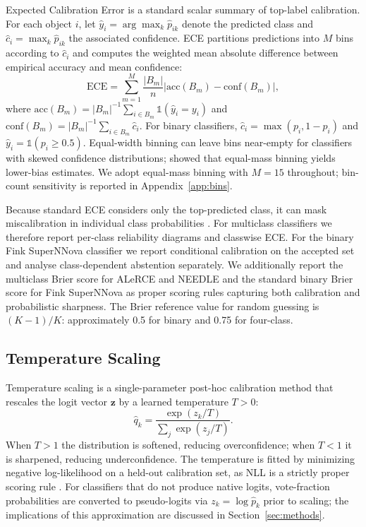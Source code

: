 \documentclass[a4paper,fleqn,usenatbib]{mnras}
\begin{document}
Expected Calibration Error \citep[ECE;][]{naeini2015} is a
standard scalar summary of top-label calibration. For each object
$i$, let $\hat{y}_i = \arg\max_k \hat{p}_{ik}$ denote the predicted
class and $\hat{c}_i = \max_k \hat{p}_{ik}$ the associated
confidence. ECE partitions predictions into $M$ bins according to
$\hat{c}_i$ and computes the weighted mean absolute difference
between empirical accuracy and mean confidence:
\begin{equation}
    \text{ECE} = \sum_{m=1}^{M} \frac{|B_m|}{n}
    \left| \text{acc}(B_m) - \text{conf}(B_m) \right|,
    \label{eq:ece}
\end{equation}
where $\text{acc}(B_m) =
|B_m|^{-1}\sum_{i\in B_m}\mathbb{1}(\hat{y}_i=y_i)$ and
$\text{conf}(B_m)=|B_m|^{-1}\sum_{i\in B_m}\hat{c}_i$.
For binary classifiers, $\hat{c}_i=\max(p_i,1-p_i)$ and
$\hat{y}_i=\mathbb{1}(p_i\geq 0.5)$. Equal-width binning can leave
bins near-empty for classifiers with skewed confidence distributions;
\citet{roelofs2022} showed that equal-mass binning yields lower-bias
estimates. We adopt equal-mass binning with $M=15$ throughout;
bin-count sensitivity is reported in Appendix~\ref{app:bins}.

Because standard ECE considers only the top-predicted class, it
can mask miscalibration in individual class probabilities
\citep{nixon2019}. For multiclass classifiers we therefore report
per-class reliability diagrams and classwise ECE. For the binary
Fink SuperNNova classifier we report conditional calibration on
the accepted set and analyse class-dependent abstention separately.
We additionally report the multiclass Brier score \citep{brier1950}
for ALeRCE and NEEDLE and the standard binary Brier score for
Fink SuperNNova as proper scoring rules capturing both calibration
and probabilistic sharpness. The Brier reference value for random
guessing is $(K-1)/K$: approximately 0.5 for binary and 0.75
for four-class.

\subsection{Temperature Scaling}\label{sec:tempscaling}

Temperature scaling \citep{guo2017} is a single-parameter post-hoc
calibration method that rescales the logit vector $\mathbf{z}$ by
a learned temperature $T > 0$:
\begin{equation}
    \hat{q}_k = \frac{\exp(z_k/T)}{\sum_j \exp(z_j/T)}.
    \label{eq:tempscaling}
\end{equation}
When $T > 1$ the distribution is softened, reducing overconfidence;
when $T < 1$ it is sharpened, reducing underconfidence. The
temperature is fitted by minimizing negative log-likelihood on a
held-out calibration set, as NLL is a strictly proper scoring rule
\citep{gneiting2007}. For classifiers that do not produce native
logits, vote-fraction probabilities are converted to pseudo-logits
via $z_k = \log \hat{p}_k$ prior to scaling; the implications of
this approximation are discussed in Section~\ref{sec:methods}.
\end{document}

